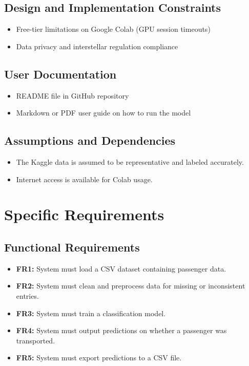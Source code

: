 \documentclass[15pt]{article}
\begin{document}
\subsection{Design and Implementation Constraints}
\begin{itemize}
    \item Free-tier limitations on Google Colab (GPU session timeouts)
    \item Data privacy and interstellar regulation compliance
\end{itemize}

\subsection{User Documentation}
\begin{itemize}
    \item README file in GitHub repository
    \item Markdown or PDF user guide on how to run the model
\end{itemize}

\subsection{Assumptions and Dependencies}
\begin{itemize}
    \item The Kaggle data is assumed to be representative and labeled accurately.
    \item Internet access is available for Colab usage.
\end{itemize}

\section{Specific Requirements}
\subsection{Functional Requirements}
\begin{itemize}
    \item \textbf{FR1:} System must load a CSV dataset containing passenger data.
    \item \textbf{FR2:} System must clean and preprocess data for missing or inconsistent entries.
    \item \textbf{FR3:} System must train a classification model.
    \item \textbf{FR4:} System must output predictions on whether a passenger was transported.
    \item \textbf{FR5:} System must export predictions to a CSV file.
\end{itemize}
\end{document}
